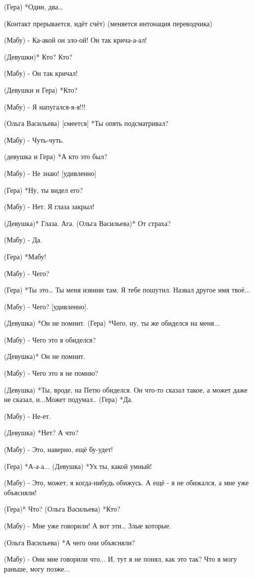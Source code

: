 (Гера) *Один, два…

(Контакт прерывается, идёт счёт)
(меняется интонация переводчика)

(Мабу) - Ка-акой он зло-ой! Он так крича-а-ал!

(Девушки)* Кто? Кто?

(Мабу) - Он так кричал!

(Девушки и Гера) *Кто?

(Мабу) - Я напугался-я-я!!! 

(Ольга Васильева) [смеется] *Ты опять подсматривал?

(Мабу) - Чуть-чуть.

(девушка и Гера) *А кто это был?

(Мабу) - Не знаю! [удивленно] 

(Гера) *Ну, ты видел его? 

(Мабу) - Нет. Я глаза закрыл!

(Девушка)* Глаза. Ага.
(Ольга Васильева)* От страха?

(Мабу) - Да.

(Гера) *Мабу!

(Мабу) - Чего? 

(Гера) *Ты это… Ты меня извини там. Я тебе пошутил. Назвал другое имя твоё... 

(Мабу) - Чего? [удивленно].

(Девушка) *Он не помнит.
(Гера) *Чего, ну, ты же обиделся на меня... 

(Мабу) - Чего это я обиделся?

(Девушка)* Он не помнит.

(Мабу) - Чего это я не помню?

(Девушка) *Ты, вроде, на Петю обиделся. Он что-то сказал такое, а может даже не сказал, и...Может подумал..
(Гера) *Да.

(Мабу) - Не-ет.

(Девушка) *Нет? А что?

(Мабу) - Это, наверно, ещё бу-удет!

(Гера) *А-а-а...
(Девушка) *Ух ты, какой умный!

(Мабу)  - Это, может, я когда-нибудь обижусь. А ещё - я не обижался, а мне уже объясняли!

(Гера)* Что?
(Ольга Васильева) *Кто?

(Мабу) - Мне уже говорили! А вот эти… Злые которые.

(Ольга Васильева) *А чего они объясняли?

(Мабу) - Они мне говорили что... И, тут я не понял, как это так?  Что я могу раньше, могу позже... 

